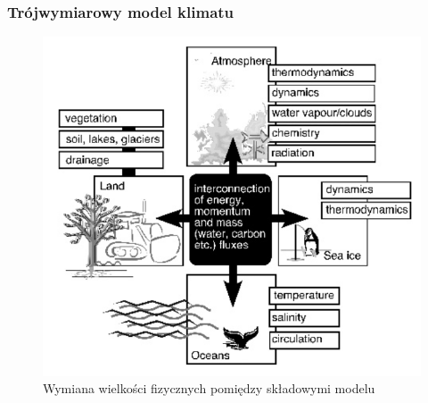 \documentclass{beamer}
\begin{document}
\begin{frame}
	\frametitle{Trójwymiarowy model klimatu}
	\begin{figure}[h]
		\begin{center}
			\includegraphics[width=0.6\linewidth]{images/Figure6.png}
			\caption{Wymiana wielkości fizycznych pomiędzy składowymi modelu}
		\end{center}
	\end{figure}
\end{frame}
\end{document}
